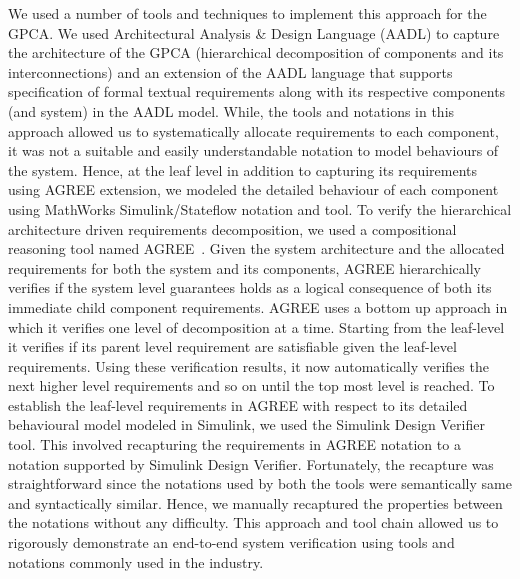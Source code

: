 We used a number of tools and techniques to implement this approach for the GPCA. We used Architectural Analysis \& Design Language (AADL) to capture the architecture of the GPCA (hierarchical decomposition of components and its interconnections) and an extension of the AADL language that supports specification of formal textual requirements along with its respective components (and system) in the AADL model. While, the tools and notations in this approach allowed us to systematically allocate requirements to each component, it was not a suitable and easily understandable notation to model behaviours of the system. Hence, at the leaf level in addition to capturing its requirements using AGREE extension, we modeled the detailed behaviour of each component using MathWorks Simulink/Stateflow notation and tool. To verify the hierarchical architecture driven requirements decomposition, we used a compositional reasoning tool named AGREE~\cite{NFM2012:CoGaMiWhLaLu}. Given the system architecture and the allocated requirements for both the system and its components, AGREE hierarchically verifies if the system level guarantees holds as a logical consequence of both its immediate child component requirements. AGREE uses a bottom up approach in which it verifies one level of decomposition at a time. Starting from the leaf-level it verifies if its parent level requirement are satisfiable given the leaf-level requirements. Using these verification results, it now automatically verifies the next higher level requirements and so on until the top most level is reached. To establish the leaf-level requirements in AGREE with respect to its detailed behavioural model modeled in Simulink, we used the Simulink Design Verifier tool. This involved recapturing the requirements in AGREE notation to a notation supported by Simulink Design Verifier. Fortunately, the recapture was straightforward since the notations used by both the tools were semantically same and syntactically similar. Hence, we manually recaptured the properties between the notations without any difficulty. This approach and tool chain allowed us to rigorously demonstrate an end-to-end system verification using tools and notations commonly used in the industry.

